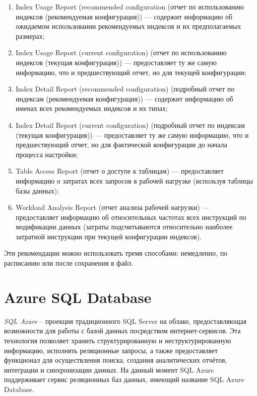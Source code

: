 \begin{enumerate}
\item Index Usage Report (recommended configuration (отчет по использованию индексов (рекомендуемая конфигурация)) — содержит информацию об ожидаемом использовании рекомендуемых индексов и их предполагаемых размерах;
\item Index Usage Report (current configuration) (отчет по использованию индексов (текущая конфигурация)) — предоставляет ту же самую информацию, что и предшествующий отчет, но для текущей конфигурации;
\item  Index Detail Report (recommended configuration) (подробный отчет по индексам (рекомендуемая конфигурация)) — содержит информацию об именах всех рекомендуемых индексов и их типах;
\item Index Detail Report (current configuration) (подробный отчет по индексам (текущая конфигурация)) — предоставляет ту же самую информацию, что и предшествующий отчет, но для фактической конфигурации до начала процесса настройки;
\item Table Access Report (отчет о доступе к таблицам) — предоставляет информацию о затратах всех запросов в рабочей нагрузке (используя таблицы базы данных);
\item Workload Analysis Report (отчет анализа рабочей нагрузки) — предоставляет информацию об относительных частотах всех инструкций по модификации данных (затраты подсчитываются относительно наиболее затратной инструкции при текущей конфигурации индексов).
\end{enumerate}

Эти рекомендации можно использовать тремя способами: немедленно, по расписанию или после сохранения в файл. \cite{petkovich:sql-server-2012}

\section{Azure SQL Database}

\textit{SQL Azure} – проекция традиционного SQL Server на облако, предоставляющая возможности для работы с базой данных посредством интернет-сервисов. Эта технология позволяет хранить структурированную и неструктурированную информацию, исполнять реляционные запросы, а также предоставляет функционал для осуществления поиска, создания аналитических отчётов, интеграции и синхронизации данных. На данный момент SQL Azure поддерживает сервис реляционных баз данных, имеющий название SQL Azure Database. 

